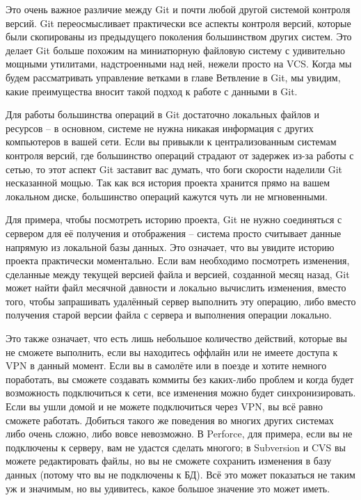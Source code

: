 Это очень важное различие между Git и почти любой другой системой контроля версий. Git переосмысливает практически все аспекты контроля версий, которые были скопированы из предыдущего поколения большинством других систем. Это делает Git больше похожим на миниатюрную файловую систему с удивительно мощными утилитами, надстроенными над ней, нежели просто на VCS. Когда мы будем рассматривать управление ветками в главе Ветвление в Git, мы увидим, какие преимущества вносит такой подход к работе с данными в Git.

Для работы большинства операций в Git достаточно локальных файлов и ресурсов --  в основном, системе не нужна никакая информация с других компьютеров в вашей сети. Если вы привыкли к централизованным системам контроля версий, где большинство операций страдают от задержек из-за работы с сетью, то этот аспект Git заставит вас думать, что боги скорости наделили Git несказанной мощью. Так как вся история проекта хранится прямо на вашем локальном диске, большинство операций кажутся чуть ли не мгновенными.

Для примера, чтобы посмотреть историю проекта, Git не нужно соединяться с сервером для её получения и отображения -- система просто считывает данные напрямую из локальной базы данных. Это означает, что вы увидите историю проекта практически моментально. Если вам необходимо посмотреть изменения, сделанные между текущей версией файла и версией, созданной месяц назад, Git может найти файл месячной давности и локально вычислить изменения, вместо того, чтобы запрашивать удалённый сервер выполнить эту операцию, либо вместо получения старой версии файла с сервера и выполнения операции локально.

Это также означает, что есть лишь небольшое количество действий, которые вы не сможете выполнить, если вы находитесь оффлайн или не имеете доступа к VPN в данный момент. Если вы в самолёте или в поезде и хотите немного поработать, вы сможете создавать коммиты без каких-либо проблем и когда будет возможность подключиться к сети, все изменения можно будет синхронизировать. Если вы ушли домой и не можете подключиться через VPN, вы всё равно сможете работать.
Добиться такого же поведения во многих других системах либо очень сложно, либо вовсе невозможно. В Perforce, для примера, если вы не подключены к серверу, вам не удастся сделать многого; в Subversion и CVS вы можете редактировать файлы, но вы не сможете сохранить изменения в базу данных (потому что вы не подключены к БД). Всё это может показаться не таким уж и значимым, но вы удивитесь, какое большое значение это может
иметь.

